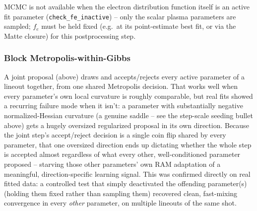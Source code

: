 \documentclass[11pt]{article}
\newcommand{\code}[1]{\texttt{#1}}
\begin{document}
MCMC is not available when the electron distribution function itself is an active fit
parameter (\code{check\_fe\_inactive}) -- only the scalar plasma parameters are sampled;
$f_e$ must be held fixed (e.g.\ at its point-estimate best fit, or via the Matte closure)
for this postprocessing step.

\subsubsection{Block Metropolis-within-Gibbs}\label{sec:uq-mcmc-block}

A joint proposal (above) draws and accepts/rejects every active parameter of a lineout
together, from one shared Metropolis decision. That works well when every parameter's own
local curvature is roughly comparable, but real fits showed a recurring failure mode when
it isn't: a parameter with substantially negative normalized-Hessian curvature (a genuine
saddle -- see the step-scale seeding bullet above) gets a hugely oversized regularized
proposal in its own direction. Because the joint step's accept/reject decision is a single
coin flip shared by every parameter, that one oversized direction ends up dictating
whether the whole step is accepted almost regardless of what every other,
well-conditioned parameter proposed -- starving those other parameters' own RAM adaptation
of a meaningful, direction-specific learning signal. This was confirmed directly on real
fitted data: a controlled test that simply deactivated the offending parameter(s) (holding
them fixed rather than sampling them) recovered clean, fast-mixing convergence in every
\emph{other} parameter, on multiple lineouts of the same shot.
\end{document}

